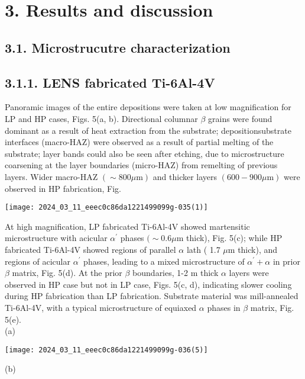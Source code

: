\documentclass[10pt]{article}
\begin{document}
\section*{3. Results and discussion}
\subsection*{3.1. Microstrucutre characterization}
\subsection*{3.1.1. LENS fabricated Ti-6Al-4V}
Panoramic images of the entire depositions were taken at low magnification for LP and HP cases, Figs. 5(a, b). Directional columnar $\beta$ grains were found dominant as a result of heat extraction from the substrate; depositionsubstrate interfaces (macro-HAZ) were observed as a result of partial melting of the substrate; layer bands could also be seen after etching, due to microstructure coarsening at the layer boundaries (micro-HAZ) from remelting of previous layers. Wider macro-HAZ $(\sim 800 \mu \mathrm{m})$ and thicker layers $(600-900 \mu \mathrm{m})$ were observed in HP fabrication, Fig.

\begin{center}
\texttt{[image: 2024\_03\_11\_eeec0c86da1221499099g-035(1)]}
\end{center}

At high magnification, LP fabricated Ti-6Al-4V showed martensitic microstructure with acicular $\alpha^{\prime}$ phases $(\sim 0.6 \mu \mathrm{m}$ thick), Fig. 5(c); while HP fabricated Ti-6Al-4V showed regions of parallel $\alpha$ lath ( 1.7 $\mu \mathrm{m}$ thick), and regions of acicular $\alpha^{\prime}$ phases, leading to a mixed microstructure of $\alpha^{\prime}+\alpha$ in prior $\beta$ matrix, Fig. 5(d). At the prior $\beta$ boundaries, 1-2 $\mathrm{m}$ thick $\alpha$ layers were observed in HP case but not in LP case, Figs. 5(c, d), indicating slower cooling during HP fabrication than LP fabrication. Substrate material was mill-annealed Ti-6Al-4V, with a typical microstructure of equiaxed $\alpha$ phases in $\beta$ matrix, Fig. 5(e).\\
(a)

\begin{center}
\texttt{[image: 2024\_03\_11\_eeec0c86da1221499099g-036(5)]}
\end{center}

(b)
\end{document}
